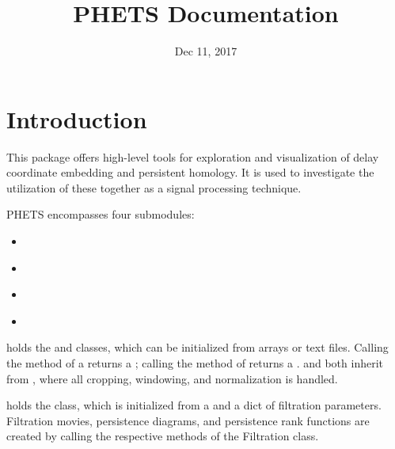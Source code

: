 \documentclass[letterpaper,10pt,openany,oneside,english]{sphinxmanual}
\title{PHETS Documentation}
\date{Dec 11, 2017}
\author{}
\begin{document}
\maketitle
\sphinxtableofcontents
{}\label{\detokenize{index::doc}}



\chapter{Introduction}
\label{\detokenize{index:introduction}}\label{\detokenize{index:welcome-to-the-phets-documentation}}
This package offers high-level tools for exploration and visualization
of delay coordinate embedding and persistent homology. It is used to
investigate the utilization of these together as a signal processing
technique.

PHETS encompasses four submodules:
\begin{itemize}
\item {} 
{\hyperref[\detokenize{signals:module-signals}]{}}

\item {} 
{\hyperref[\detokenize{phomology:module-phomology}]{}}

\item {} 
{\hyperref[\detokenize{embed:module-embed}]{}}

\item {} 
{\hyperref[\detokenize{prfstats:module-prfstats}]{}}

\end{itemize}

 holds the  and  classes, which can be
initialized from arrays or text files. Calling the  method of a
 returns a ; calling the  method of
 returns a .  and  both
inherit from , where all cropping, windowing, and
normalization is handled.

 holds the  class, which is initialized from a
 and a dict of filtration parameters. Filtration movies,
persistence diagrams, and persistence rank functions are created by calling the
respective methods of the Filtration class.
\end{document}
